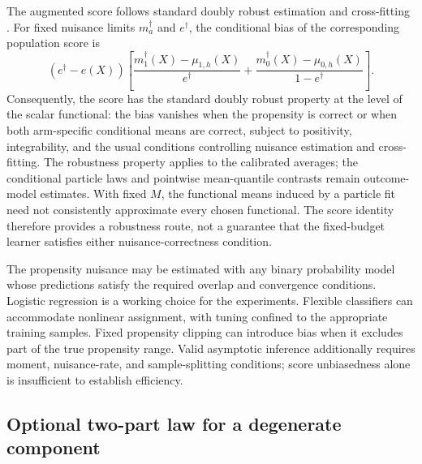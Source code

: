 \documentclass[11pt]{article}
\begin{document}
The augmented score follows standard doubly robust estimation and cross-fitting \citep{bang2005doubly,chernozhukov2018double}. For fixed nuisance limits $m_a^\dagger$ and $e^\dagger$, the conditional bias
of the corresponding population score is
\[
 (e^\dagger-e(X))\left[
 \frac{m_1^\dagger(X)-\mu_{1,h}(X)}{e^\dagger}
 +\frac{m_0^\dagger(X)-\mu_{0,h}(X)}{1-e^\dagger}
 \right].
\]
Consequently, the score has the standard doubly robust property at the level
of the scalar functional: the bias vanishes when the propensity is correct or
when both arm-specific conditional means are correct, subject to positivity,
integrability, and the usual conditions controlling nuisance estimation and
cross-fitting. The robustness property applies to the calibrated averages; the conditional particle laws and pointwise mean-quantile contrasts remain outcome-model estimates. With fixed $M$, the functional means induced by a particle fit need not consistently approximate every chosen functional. The score identity therefore provides a robustness route, not a guarantee that the fixed-budget learner satisfies either nuisance-correctness condition.

The propensity nuisance may be estimated with any binary probability model whose predictions satisfy the required overlap and convergence conditions. Logistic regression is a working choice for the experiments. Flexible classifiers can accommodate nonlinear assignment, with tuning confined to the appropriate training samples. Fixed propensity clipping can introduce bias when it excludes part of the true propensity range. Valid asymptotic inference additionally requires moment, nuisance-rate, and sample-splitting conditions; score unbiasedness alone is insufficient to establish efficiency.

\subsection{Optional two-part law for a degenerate component}\label{sec:zipt}
\end{document}
